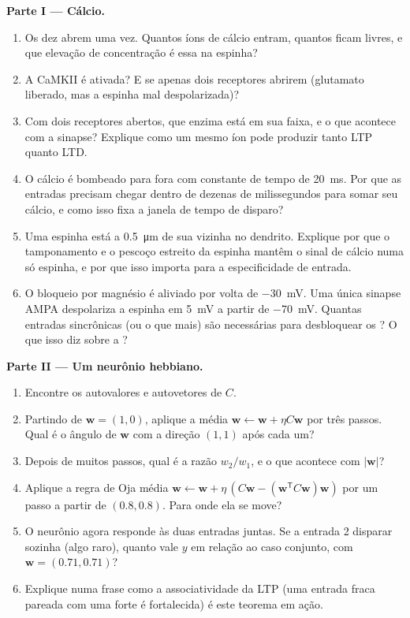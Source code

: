\begin{problem}
\medskip
\noindent\textbf{Parte I --- Cálcio.}
\begin{enumerate}
  \item Os dez  abrem uma vez. Quantos íons de cálcio
        entram, quantos ficam livres, e que elevação de concentração é
        essa na espinha?
  \item A CaMKII é ativada? E se apenas dois receptores abrirem
        (glutamato liberado, mas a espinha mal despolarizada)?
  \item Com dois receptores abertos, que enzima está em sua faixa, e o
        que acontece com a sinapse? Explique como um mesmo íon pode
        produzir tanto LTP quanto LTD.
  \item O cálcio é bombeado para fora com constante de tempo de
        \qty{20}{ms}. Por que as entradas precisam chegar dentro de
        dezenas de milissegundos para somar seu cálcio, e como isso fixa
        a janela de tempo de disparo?
  \item Uma espinha está a \qty{0.5}{\micro m} de sua vizinha no
        dendrito. Explique por que o tamponamento e o pescoço estreito
        da espinha mantêm o sinal de cálcio numa só espinha, e por que
        isso importa para a especificidade de entrada.
  \item O bloqueio por magnésio é aliviado por volta de \qty{-30}{mV}.
        Uma única sinapse AMPA despolariza a espinha em \qty{5}{mV} a
        partir de \qty{-70}{mV}. Quantas entradas sincrônicas (ou o que
        mais) são necessárias para desbloquear os ? O que
        isso diz sobre a ?
\end{enumerate}

\medskip
\noindent\textbf{Parte II --- Um neurônio hebbiano.}
\begin{enumerate}[resume]
  \item Encontre os autovalores e autovetores de $C$.
  \item Partindo de $\mathbf{w} = (1, 0)$, aplique a  média
        $\mathbf{w} \leftarrow \mathbf{w} + \eta C\mathbf{w}$ por três
        passos. Qual é o ângulo de $\mathbf{w}$ com a direção $(1,1)$
        após cada um?
  \item Depois de muitos passos, qual é a razão $w_{2}/w_{1}$, e o que
        acontece com $|\mathbf{w}|$?
  \item Aplique a regra de Oja média $\mathbf{w} \leftarrow \mathbf{w} +
        \eta\,(C\mathbf{w} - (\mathbf{w}^{\mathsf{T}}C\mathbf{w})
        \mathbf{w})$ por um passo a partir de $(0.8, 0.8)$. Para onde
        ela se move?
  \item O neurônio agora responde às duas entradas juntas. Se a entrada
        2 disparar sozinha (algo raro), quanto vale $y$ em relação ao
        caso conjunto, com $\mathbf{w} = (0.71, 0.71)$?
  \item Explique numa frase como a associatividade da LTP (uma entrada
        fraca pareada com uma forte é fortalecida) é este teorema em
        ação.
\end{enumerate}


\end{problem}
